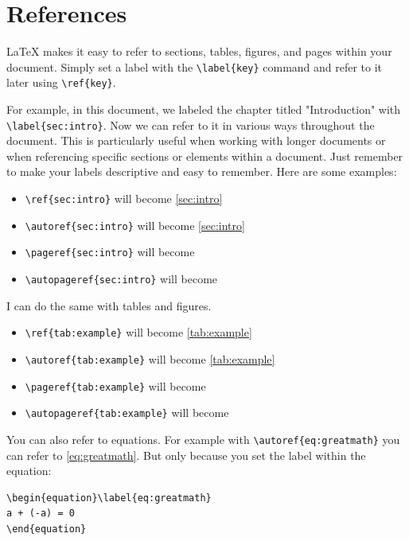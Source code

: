 \documentclass[12pt,final,a4paper,oneside]{book}
\begin{document}
\section{References}
	
\LaTeX{} makes it easy to refer to sections, tables, figures, and pages within your document. Simply set a label with the \verb*|\label{key}| command and refer to it later using \verb*|\ref{key}|.
	
For example, in this document, we labeled the chapter titled "Introduction" with \verb*|\label{sec:intro}|. Now we can refer to it in various ways throughout the document. This is particularly useful when working with longer documents or when referencing specific sections or elements within a document. Just remember to make your labels descriptive and easy to remember. Here are some examples:
	
\begin{itemize}
	\item \verb*|\ref{sec:intro}| will become \ref{sec:intro}	
	\item \verb*|\autoref{sec:intro}| will become \autoref{sec:intro}	
	\item \verb*|\pageref{sec:intro}| will become \pageref{sec:intro}
	\item \verb*|| will become \autopageref{sec:intro}
\end{itemize} 
	
I can do the same with tables and figures. 
	
\begin{itemize}
	\item \verb*|\ref{tab:example}| will become \ref{tab:example}	
	\item \verb*|\autoref{tab:example}| will become \autoref{tab:example}	
	\item \verb*|\pageref{tab:example}| will become \pageref{tab:example}
	\item \verb*|| will become \autopageref{tab:example}
\end{itemize} 

You can also refer to equations. For example with \verb|\autoref{eq:greatmath}| you can refer to \autoref{eq:greatmath}. But only because you set the label within the equation:
\begin{verbatim}
\begin{equation}\label{eq:greatmath}
a + (-a) = 0
\end{equation}
\end{verbatim}
	
\end{document}

